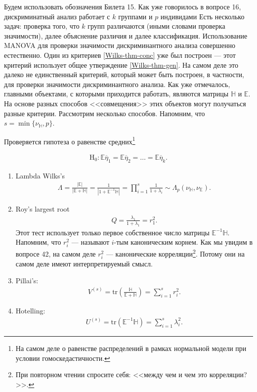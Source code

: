 Будем использовать обозначения Билета 15. 
Как уже говорилось в вопросе 16, дискриминатный анализ работает с $k$ группами и $p$ индивидами
Есть несколько задач: проверка того, что $k$ групп различаются (иными словами
проверка значимости), далее объяснение различия и далее классификация.
Использование MANOVA для проверки значимости дискриминантного анализа совершенно естественно.
Один из критериев \ref{Wilks-thm-conc} уже был построен --- этот критерий использует
общее утверждение \ref{Wilks-thm-gen}.
На самом деле это далеко не единственный критерий, который может быть построен, в частности, для проверки значимости дискриминантного анализа.
Как уже отмечалось, главными объектами, с которыми приходится работать, являются матрицы $\mathbb H$ и $\mathbb E$.
На основе разных способов <<совмещения>> этих объектов могут получаться разные критерии.
Рассмотрим несколько способов. Напомним, что $s = \min\{\nu_\mathbb H, p\}$.

Проверяется гипотеза о равенстве средних\footnote{На самом деле о равенстве распределений в рамках нормальной модели при условии гомоскедастичности.}

\begin{gather*}
    \mathrm H_0: \mathbb E \overline \eta_1 = \mathbb E \overline \eta_2 = \ldots = \mathbb E \overline \eta_k.
\end{gather*}
\begin{enumerate}
    \item Lambda Wilks's
        \begin{gather*}
            \Lambda = \frac{|\mathbb{E}|}{|\mathbb E + \mathbb H|} = \frac{1}{|1 + \mathbb E^{-1} \mathbb H|} = \prod_{i=1}^s \frac{1}{1 + \lambda_i}
            \sim \Lambda_p(\nu_\mathbb H, \nu_\mathbb E).
        \end{gather*}
    \item Roy's largest root
        \begin{gather*}
            Q = \frac{\lambda_1}{1 + \lambda_1} = r_1^2.
        \end{gather*}
        Этот тест использует только первое собственное число матрицы $\mathbb E^{-1} \mathbb H$.
        Напомним, что $r_i^2$ --- называют $i$-тым каноническим корнем. Как мы увидим в вопросе 42, на самом деле $r_i^2$ --- канонические корреляции\footnote{
        При повторном чтении спросите себя: <<между чем и чем это корреляции?>>.}.
        Потому они на самом деле имеют интерпретируемый смысл.
    \item Pillai's:
        \begin{gather*}
            V^{(s)} = \mathrm {tr} \left(\frac{\mathbb H}{\mathbb E + \mathbb H}\right) = \sum_{i=1}^s r_i^2.
        \end{gather*}
    \item Hotelling:
        \begin{gather*}
            U^{(s)} = \mathrm {tr} \left(\mathbb E^{-1} \mathbb H \right) = \sum_{i=1}^s \lambda_i^2.
        \end{gather*}
\end{enumerate}

